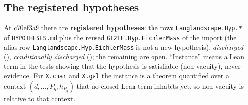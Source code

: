 \subsection{The registered hypotheses}
At c70ef3a9 there are \textbf{\NumHypRegistered{} registered hypotheses}: the \NumHypRows{} rows \texttt{Langlandscape.Hyp.*} of
\texttt{HYPOTHESES.md} plus the reused \texttt{GL2TF.Hyp.EichlerMass} of the import (the alias row
\texttt{Langlandscape.Hyp.EichlerMass} is not a new hypothesis). \NumHypDischarged{} \emph{discharged} (\HypDischargedNames), \NumHypCondDischarged{}
\emph{conditionally discharged} (\HypCondDischargedNames); the remaining \NumHypOpen{} are open.
``Instance'' means a Lean term in the tests showing that the hypothesis is satisfiable (non-vacuity), never evidence.
For \texttt{X.char} and \texttt{X.gal} the instance is a theorem quantified over a context $(d,\dots,P_q,h_{P_q})$ that no
closed Lean term inhabits yet, so non-vacuity is relative to that context.
\begingroup\small\setlength{\tabcolsep}{4pt}
